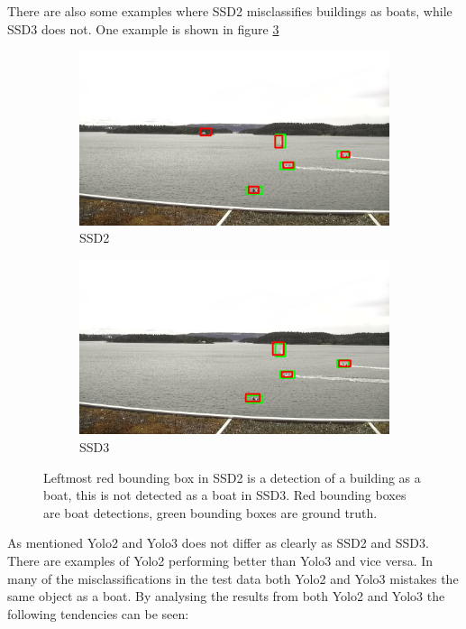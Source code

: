 There are also some examples where SSD2 misclassifies buildings as boats, while SSD3 does not. One example is shown in figure \ref{img:misclass_ssd}

\begin{figure}[h!]
\begin{subfigure}{.5\textwidth}
  \centering
  \includegraphics[width=0.9\linewidth]{results/case_buildings/misclass/selected_08_07_frame11982_bbnb.jpg}
  \caption{SSD2}
  \label{fig:misclass_ssd2}
\end{subfigure}%
\begin{subfigure}{.5\textwidth}
  \centering
  \includegraphics[width=.9\linewidth]{results/case_buildings/misclass/selected_08_07_frame11982_build.jpg}
  \caption{SSD3}
  \label{fig:misclass_ssd3}
\end{subfigure}
\caption{Leftmost red bounding box in SSD2 is a detection of a building as a boat, this is not detected as a boat in SSD3. Red bounding boxes are boat detections, green bounding boxes are ground truth.}
\label{img:misclass_ssd}
\end{figure}

\vspace{3mm}
\newpage

As mentioned Yolo2 and Yolo3 does not differ as clearly as SSD2 and SSD3. There are examples of Yolo2 performing better than Yolo3 and vice versa. In many of the misclassifications in the test data both Yolo2 and Yolo3 mistakes the same object as a boat. By analysing the results from both Yolo2 and Yolo3 the following tendencies can be seen:

